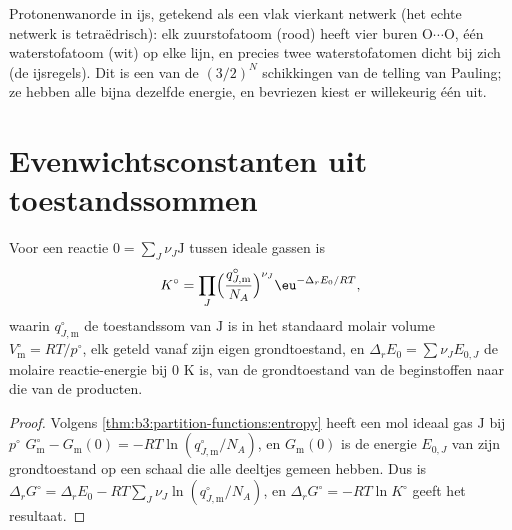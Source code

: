 \begin{omfigure}

{\small Protonenwanorde in ijs, getekend als een vlak vierkant netwerk (het
echte netwerk is tetraëdrisch): elk zuurstofatoom (rood) heeft vier buren
O$\cdots$O, één waterstofatoom (wit) op elke lijn, en precies twee
waterstofatomen dicht bij zich (de ijsregels). Dit is een van de $(3/2)^N$
schikkingen van de telling van Pauling; ze hebben alle bijna dezelfde
energie, en bevriezen kiest er willekeurig één uit.}
\end{omfigure}

\section{Evenwichtsconstanten uit toestandssommen}

\begin{theorem}\label{thm:b3:statistical-thermo-applied:k-from-q}
Voor een reactie $0 = \sum_J\nu_J\mathrm J$ tussen ideale gassen is
\[
  K^\circ = \prod_J\Bigl(\frac{q^\circ_{J,\mathrm m}}{N_A}\Bigr)^{\nu_J}\eu^{-\Delta_rE_0/RT},
\]
waarin $q^\circ_{J,\mathrm m}$ de toestandssom van $\mathrm J$ is in het
standaard molair volume
$V^\circ_{\mathrm m} = RT/p^\circ$, elk geteld vanaf zijn eigen
grondtoestand, en $\Delta_rE_0 =
\sum\nu_JE_{0,J}$ de molaire reactie-energie bij 0 K is, van de
grondtoestand van de beginstoffen naar die van de producten.
\end{theorem}

\begin{proof}
Volgens \cref{thm:b3:partition-functions:entropy} heeft een mol ideaal gas $\mathrm J$ bij $p^\circ$
$G^\circ_{\mathrm m} - G_{\mathrm m}(0) = -RT\ln(q^\circ_{J,\mathrm m}/N_A)$, en $G_{\mathrm m}(0)$ is de energie $E_{0,J}$
van zijn grondtoestand op een schaal die alle deeltjes gemeen hebben. Dus
is $\Delta_rG^\circ =
\Delta_rE_0 - RT\sum_J\nu_J\ln(q^\circ_{J,\mathrm m}/N_A)$, en $\Delta_rG^\circ = -RT\ln K^\circ$ geeft het
resultaat.
\end{proof}

